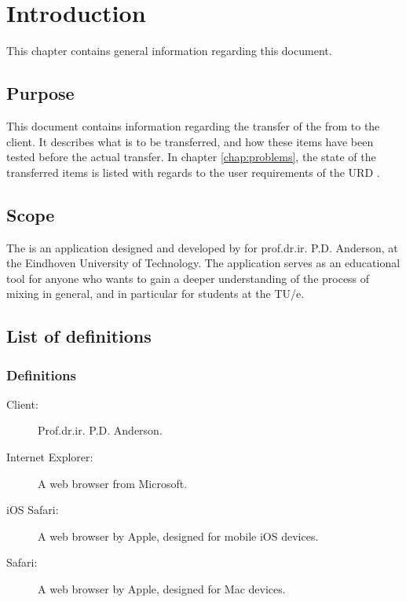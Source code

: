 \chapter{Introduction}
This chapter contains general information regarding this document.

\section{Purpose}
This document contains information regarding the transfer of the \applicationname{} from \projectauthor{} to the client. It describes what is to be transferred, and how these items have been tested before the actual transfer. In chapter \ref{chap:problems}, the state of the transferred items is listed with regards to the user requirements of the URD \cite{urd}.

\section{Scope}
The \applicationname{} is an application designed and developed by \projectauthor{} for prof.dr.ir. P.D. Anderson, at the Eindhoven University of Technology. The application serves as an educational tool for anyone who wants to gain a deeper understanding of the process of mixing in general, and in particular for students at the TU/e.

\section{List of definitions}
\subsection{Definitions}
\begin{description}
\item[Client:] Prof.dr.ir. P.D. Anderson.
\item[Internet Explorer:] A web browser from Microsoft.
\item[iOS Safari:] A web browser by Apple, designed for mobile iOS devices.
\item[Safari:] A web browser by Apple, designed for Mac devices.
\end{description}

